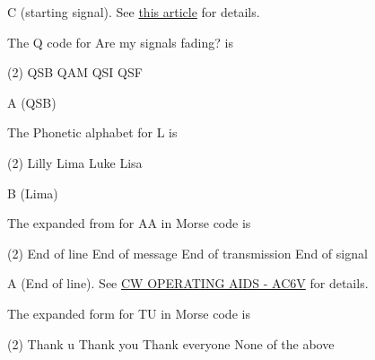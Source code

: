 \documentclass[a4paper]{article}
\begin{document}
\begin{solution}
	C (starting signal). See \href{https://en.wikipedia.org/wiki/Prosigns_for_Morse_code}{this article} for details.
\end{solution}

\vspace{5mm}



\begin{question}The Q code for \apostrophe{}Are my signals fading?\apostrophe{} is
	\begin{tasks}(2)
		\task QSB
		\task QAM
		\task QSI
		\task QSF
	\end{tasks}
\end{question}

\begin{solution}
	A (QSB)
\end{solution}

\vspace{5mm}



\begin{question}The Phonetic alphabet for \apostrophe{}L\apostrophe{} is
	\begin{tasks}(2)
		\task Lilly
		\task Lima
		\task Luke
		\task Lisa
	\end{tasks}
\end{question}

\begin{solution}
	B (Lima)
\end{solution}

\vspace{5mm}



\begin{question}The expanded from for \apostrophe{}AA\apostrophe{} in Morse code is
	\begin{tasks}(2)
		\task End of line
		\task End of message
		\task End of transmission
		\task End of signal
	\end{tasks}
\end{question}

\begin{solution}
	A (End of line). See \href{http://ac6v.com/morseaids.htm}{CW OPERATING AIDS - AC6V} for details.
\end{solution}

\vspace{5mm}



\begin{question}The expanded form for \apostrophe{}TU\apostrophe{} in Morse code is
	\begin{tasks}(2)
		\task Thank u
		\task Thank you
		\task Thank everyone
		\task None of the above
	\end{tasks}
\end{question}
\end{document}
